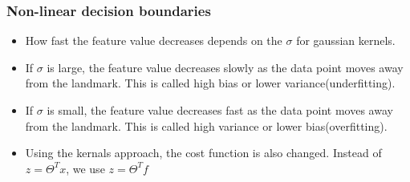 \documentclass[11pt,xcolor=dvipsnames]{beamer}
\begin{document}
\begin{frame}
\frametitle{Non-linear decision boundaries}
\begin{itemize}
\item How fast the feature value decreases depends on the $\sigma$ for gaussian kernels.\\
\item If $\sigma$ is large, the feature value decreases slowly as the data point moves away from the landmark. This is called high bias or lower variance(underfitting).\\
\item If $\sigma$ is small, the feature value decreases fast as the data point moves away from the landmark. This is called high variance or lower bias(overfitting).
\item Using the kernals approach, the cost function is also changed. Instead of $z = \Theta^T x$, we use $z = \Theta^T f$
\end{itemize}
\end{frame}
\end{document}
